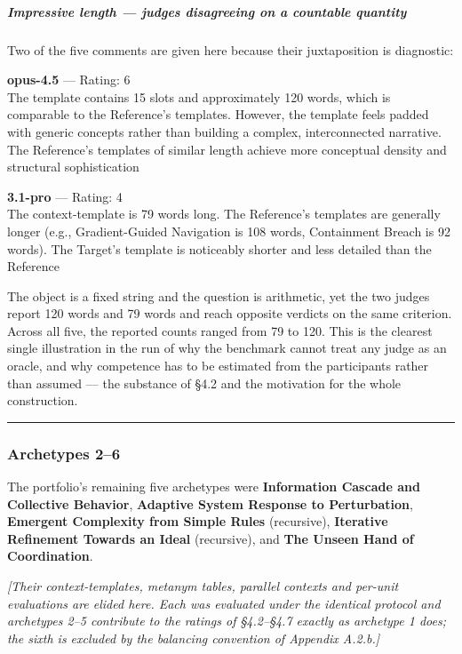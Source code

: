 \subparagraph{Impressive length --- judges disagreeing on a countable quantity}\label{impressive-length-judges-disagreeing-on-a-countable-quantity}

Two of the five comments are given here because their juxtaposition is diagnostic:

\textbf{opus-4.5} --- Rating: 6\\
The template contains 15 slots and approximately 120 words, which is comparable to the Reference's templates. However, the template feels padded with generic concepts rather than building a complex, interconnected narrative. The Reference's templates of similar length achieve more conceptual density and structural sophistication

\textbf{3.1-pro} --- Rating: 4\\
The context-template is 79 words long. The Reference's templates are generally longer (e.g., Gradient-Guided Navigation is 108 words, Containment Breach is 92 words). The Target's template is noticeably shorter and less detailed than the Reference

The object is a fixed string and the question is arithmetic, yet the two judges report 120 words and 79 words and reach opposite verdicts on the same criterion. Across all five, the reported counts ranged from 79 to 120. This is the clearest single illustration in the run of why the benchmark cannot treat any judge as an oracle, and why competence has to be estimated from the participants rather than assumed --- the substance of §4.2 and the motivation for the whole construction.

\begin{center}\rule{0.5\linewidth}{0.5pt}\end{center}

\subsubsection{Archetypes 2--6}\label{archetypes-26}

The portfolio's remaining five archetypes were \textbf{Information Cascade and Collective Behavior}, \textbf{Adaptive System Response to Perturbation}, \textbf{Emergent Complexity from Simple Rules} (recursive), \textbf{Iterative Refinement Towards an Ideal} (recursive), and \textbf{The Unseen Hand of Coordination}.

\emph{{[}Their context-templates, metanym tables, parallel contexts and per-unit evaluations are elided here. Each was evaluated under the identical protocol and archetypes 2--5 contribute to the ratings of §4.2--§4.7 exactly as archetype 1 does; the sixth is excluded by the balancing convention of Appendix A.2.b.{]}}

